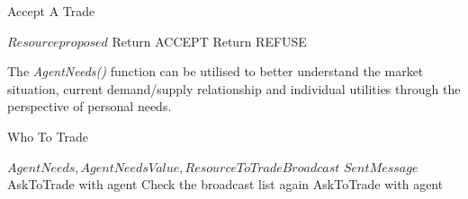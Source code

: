 
\begin{algorithm}
\caption{Accept A Trade}\label{alg:28}
\begin{algorithmic} 
\scriptsize
\Require $Resourceproposed$
\State Return ACCEPT
\Else
\State Return REFUSE
\EndIf
\end{algorithmic}
\end{algorithm}

The \textit{AgentNeeds()} function can be utilised to better understand the market situation, current demand/supply relationship and individual utilities through the perspective of personal needs.



\begin{algorithm}
\caption{Who To Trade}\label{alg:29}
\begin{algorithmic} 
\scriptsize
\Require $AgentNeeds, AgentNeedsValue, ResourceToTradeBroadcast$
\Require $SentMessage $
\State AskToTrade with agent
\EndIf
{}
\State Check the broadcast list again
\State AskToTrade with agent
\EndIf
\EndIf
\end{algorithmic}
\end{algorithm}



